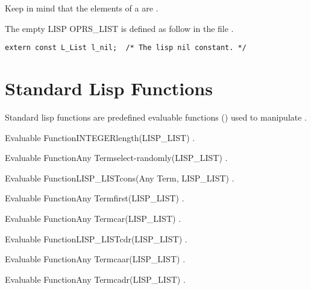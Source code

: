 Keep in mind that the elements of a  are .

The empty LISP OPRS\_LIST is defined as follow in the file .
\begin{verbatim}
extern const L_List l_nil;  /* The lisp nil constant. */
\end{verbatim}

\section{Standard Lisp Functions}

Standard lisp functions are predefined evaluable functions
() used to manipulate .

\begin{typeefa}{Evaluable Function}{INTEGER}{length}{(LISP\_LIST)}
.
\end{typeefa}

\begin{typeefa}{Evaluable Function}{Any Term}{select-randomly}{(LISP\_LIST)}
.
\end{typeefa}

\begin{typeefa}{Evaluable Function}{LISP\_LIST}{cons}{(Any Term, LISP\_LIST)}
.
\end{typeefa}

\begin{typeefa}{Evaluable Function}{Any Term}{first}{(LISP\_LIST)}
.
\end{typeefa}

\begin{typeefa}{Evaluable Function}{Any Term}{car}{(LISP\_LIST)}
.
\end{typeefa}

\begin{typeefa}{Evaluable Function}{LISP\_LIST}{cdr}{(LISP\_LIST)}
.
\end{typeefa}

\begin{typeefa}{Evaluable Function}{Any Term}{caar}{(LISP\_LIST)}
.
\end{typeefa}

\begin{typeefa}{Evaluable Function}{Any Term}{cadr}{(LISP\_LIST)}
.
\end{typeefa}

